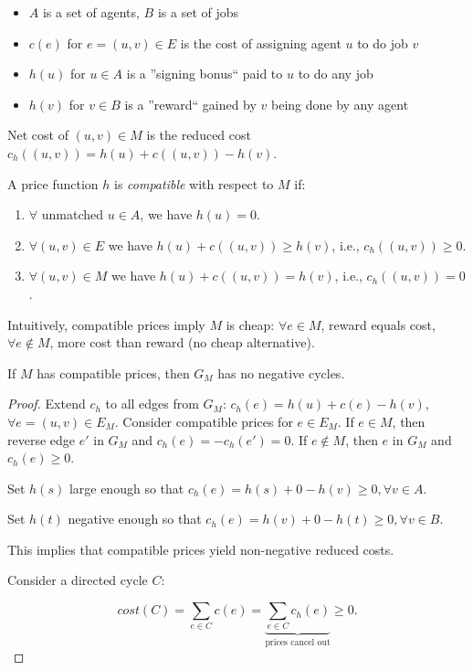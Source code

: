 \begin{itemize}
\item $A$ is a set of agents, $B$ is a set of jobs
\item $c(e)$ for $e=(u,v)\in E$ is the cost of assigning agent $u$ to do job $v$
\item $h(u)$ for $u \in A$ is a ''signing bonus`` paid to $u$ to do any job
\item $h(v)$ for $v \in B$ is a ''reward`` gained by $v$ being done by any agent
\end{itemize}

\noindent Net cost of $(u,v) \in M$ is the reduced cost $c_h((u,v)) = h(u) + c((u,v)) - h(v)$.

A price function $h$ is \emph{compatible} with respect to $M$ if:
\begin{enumerate}
\item $\forall$ unmatched $u \in A$, we have $h(u) = 0$.
\item $\forall (u,v) \in E$ we have $h(u) + c((u,v)) \ge h(v)$, i.e., $c_h((u,v))\ge 0$.
\item $\forall (u,v) \in M$ we have $h(u) + c((u,v)) = h(v)$, i.e., $c_h((u,v)) = 0$.
\end{enumerate}

\noindent Intuitively, compatible prices imply $M$ is cheap: $\forall e \in M$, reward equals cost, $\forall e \notin M$, more cost than reward (no cheap alternative).

\begin{mylemma}
If $M$ has compatible prices, then $G_M$ has no negative cycles.
\end{mylemma}
\begin{proof}
Extend $c_h$ to all edges from $G_M$: $c_h(e) = h(u) + c(e) - h(v)$, $\forall e = (u,v) \in E_M$.
Consider compatible prices for $e \in E_M$. If $e \in M$, then reverse edge $e'$ in $G_M$ and $c_h(e) = - c_h(e') = 0$. If $e \notin M$, then $e$ in $G_M$ and $c_h(e) \ge 0$.

Set $h(s)$ large enough so that $c_h(e) = h(s) + 0 - h(v) \ge 0,  \forall v \in A$.

Set $h(t)$ negative enough so that $c_h(e) = h(v) + 0 - h(t) \ge 0,  \forall v \in B$.

This implies that compatible prices yield non-negative reduced costs.

Consider a directed cycle $C$:

$${cost}(C) = \sum\limits_{e \in C} c(e) = \underbrace{\sum\limits_{e \in C} c_h(e)}_\text{prices cancel out} \ge 0.$$
\end{proof}

